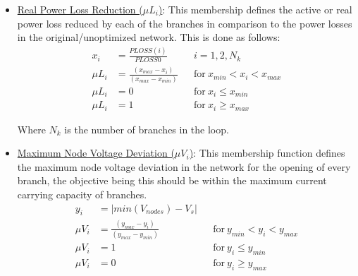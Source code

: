 \begin{itemize}

\item \underline{Real Power Loss Reduction ($\mu L_i$)}: This membership defines the active or real power loss reduced by each of the branches in comparison to the power losses in the original/unoptimized network. This is done as follows:
\begin{align*} 
x_i &= \frac{PLOSS(i)}{PLOSS0} & &i= 1,2,N_k\\
\mu L_i &= \frac{(x_{max}-x_i)}{(x_{max}-x_{min})} & &\mathrm{for}\ x_{min}<x_i<x_{max}\\
\mu L_i &=0 & &\mathrm{for}\ x_i\le x_{min}\\
\mu L_i &=1 & &\mathrm{for}\ x_i\ge x_{max}
\end{align*} 

Where $N_k$ is the number of branches in the loop.\\

\item \underline{Maximum Node Voltage Deviation ($\mu V_i$)}: This membership function defines the maximum node voltage deviation in the network for the opening of every branch, the objective being this should be within the maximum current carrying capacity of branches.
\begin{align*} 
y_i &= |min(V_{nodes})-V_s|\\
\mu V_i &= \frac{(y_{max}-y_i)}{(y_{max}-y_{min})} & &\mathrm{for}\ y_{min}<y_i<y_{max}\\
\mu V_i &=1 & &\mathrm{for}\ y_i\le y_{min}\\
\mu V_i &=0 & &\mathrm{for}\ y_i\ge y_{max}
\end{align*} 


\end{itemize}
